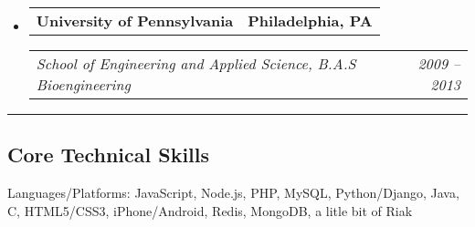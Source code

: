 \documentclass[10pt,letterpaper]{article}
\makeatletter
\newenvironment{indentsection}[1]%
{\begin{list}{}%
  {\setlength{\leftmargin}{#1}}%
  \item[]%
}
{\end{list}}
\newcommand{\headerrow}[2]
{\begin{tabular*}{\linewidth}{l@{\extracolsep{\fill}}r}
  #1 &
  #2 \\
\end{tabular*}}
\makeatother
\begin{document}
\begin{itemize}
  \parskip=0.1em

  \item 
  \headerrow
    {\textbf{University of Pennsylvania}}
    {\textbf{Philadelphia, PA}}
  
  \headerrow
    {\emph{School of Engineering and Applied Science, B.A.S Bioengineering}}
    {\emph{2009 -- 2013}}

\end{itemize}


\hrule
\vspace{-0.4em}
\subsection*{Core Technical Skills}

\begin{indentsection}{\parindent}
\begin{description*}
  \item[Languages/Platforms:]
  JavaScript, Node.js, PHP, MySQL, Python/Django, Java, C, HTML5/CSS3, iPhone/Android, Redis, MongoDB, a litle bit of Riak
\end{description*}
\end{indentsection}
\end{document}
